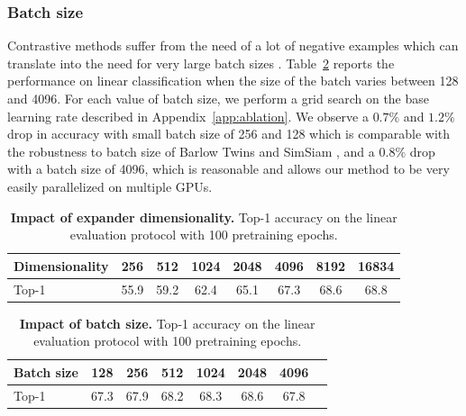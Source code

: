 \subsubsection{Batch size} \label{sec:batch_size} Contrastive methods suffer from the need of a lot of negative examples which can translate into the need for very large batch sizes \cite{chen2020simclr}. Table~\ref{tab:ablation_bs} reports the performance on linear classification when the size of the batch varies between 128 and 4096. For each value of batch size, we perform a grid search on the base learning rate described in Appendix~\ref{app:ablation}. We observe a $0.7\%$ and $1.2\%$ drop in accuracy with small batch size of 256 and 128 which is comparable with the robustness to batch size of Barlow Twins \cite{zbontar2021barlow} and SimSiam \cite{chen2020simsiam}, and a $0.8\%$ drop with a batch size of 4096, which is reasonable and allows our method to be very easily parallelized on multiple GPUs.

\begin{table}[t]
\caption{\textbf{Impact of expander dimensionality.} Top-1 accuracy on the linear evaluation protocol with 100 pretraining epochs.}
\label{tab:ablation_expander}
\vspace{-6mm}
\setlength{\tabcolsep}{10.5pt}
\vskip 0.15in
\begin{center}
\begin{tabular}{lccccccc}
\toprule
Dimensionality      & 256      & 512      & 1024      & 2048     & 4096  &  8192  &  16834 \\
\midrule
Top-1           & 55.9 & 59.2 & 62.4 & 65.1 & 67.3 & 68.6 & 68.8 \\
\bottomrule
\end{tabular}
\end{center}
\vspace{-2mm}
\end{table}

\begin{table}[t]
\caption{\textbf{Impact of batch size.} Top-1 accuracy on the linear evaluation protocol with 100 pretraining epochs.}
\label{tab:ablation_bs}
\vspace{-6mm}
\setlength{\tabcolsep}{10.5pt}
\vskip 0.15in
\begin{center}
\begin{tabular}{lccccccc}
\toprule
Batch size      & 128      & 256      & 512      & 1024     & 2048     & 4096 \\
\midrule
Top-1           & 67.3 & 67.9 & 68.2 & 68.3 & 68.6 & 67.8 \\
\bottomrule
\end{tabular}
\end{center}
\vspace{-2mm}
\end{table}


